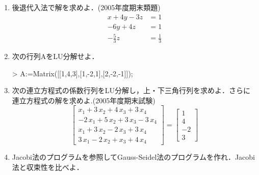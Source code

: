 \begin{enumerate}
\item 後退代入法で解を求めよ．(2005年度期末類題) 
\begin{equation*}
\begin{array}{rl}
x+4y-3z &= 1 \\
-6y+4z &= 1\\
-\frac{5}{3}z &=  \frac{1}{3}
\end{array}
\end{equation*}

\item 次の行列AをLU分解せよ．
\begin{MapleInput}
> A:=Matrix([[1,4,3],[1,-2,1],[2,-2,-1]]);
\end{MapleInput}
\begin{MapleOutput}
\end{MapleOutput}

\item 次の連立方程式の係数行列をLU分解し，上・下三角行列を求めよ．さらに連立方程式の解を求めよ.(2005年度期末試験) 
\begin{equation*}
\left[ \begin {array}{c} x_{{1}}+3\,x_{{2}}+4\,x_{{3}}+3\,x_{{4}}\\ -2\,x_{{1}}+5\,x_{{2}}+3\,x_{{3}}-3\,x_{{4}}\\ x_{{1}}+3\,x_{{2}}-2\,x_{{3}}+3\,x_{{4}}\\ 3\,x_{{1}}-2\,x_{{2}}+x_{{3}}+4\,x_{{4}}\end {array} \right] = \left[ \begin {array}{c} 1\\ 4\\ -2\\ 3\end {array} \right]
\end{equation*}

\item Jacobi法のプログラムを参照してGauss-Seidel法のプログラムを作れ．Jacobi法と収束性を比べよ．


\end{enumerate}
